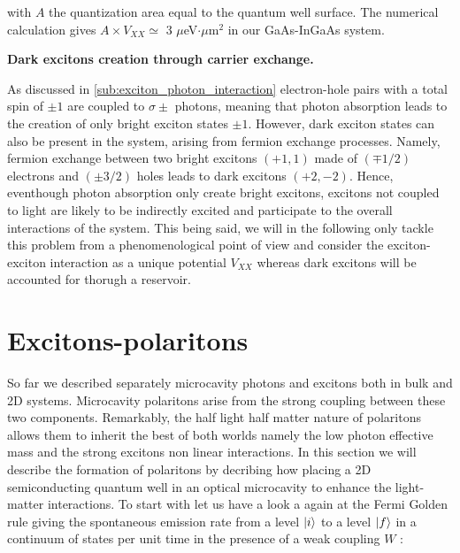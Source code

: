 with $A$ the quantization area equal to the  quantum well surface. The numerical calculation gives $A \times V_{XX}\simeq$ 3 $\mu$eV$\cdot \mu$m$^{2}$ in our GaAs-InGaAs system.



\textbf{Dark excitons creation through carrier exchange.}

As discussed in \autoref{sub:exciton_photon_interaction} electron-hole pairs with a total spin of $\pm1$ are coupled to $\sigma\pm$ photons, meaning that photon absorption leads to the creation of only bright exciton states $\pm1$. However, dark exciton states can also be present in the system, arising from fermion exchange processes.
Namely, fermion exchange between two bright excitons $(+1,1)$ made of $(\mp1/2)$ electrons and $(\pm3/2)$ holes leads to dark excitons $(+2,-2)$. Hence, eventhough photon absorption only create bright excitons, excitons not coupled to light are likely to be indirectly excited and participate to the overall interactions of the system.
This being said, we will in the following only tackle this problem from a phenomenological point of view and consider the exciton-exciton interaction as a unique potential $V_{XX}$ whereas dark excitons will be accounted for thorugh a reservoir.

  
\section{Excitons-polaritons}
So far we described separately microcavity photons and excitons both in bulk and 2D systems. Microcavity polaritons arise from the
strong coupling between these two components. Remarkably, the half light half matter nature of polaritons allows them to inherit the best of both worlds namely 
the low photon effective mass and the strong excitons non linear interactions. In this section we will describe the formation of polaritons 
by decribing how placing a 2D semiconducting quantum well in an optical microcavity to enhance the light-matter interactions. To start with let us 
have a look a again at the Fermi Golden rule giving the spontaneous emission rate from a level $\ket{i}$ to a level $\ket{f}$ in a continuum of states per unit time in the presence of a weak coupling $W$ :

